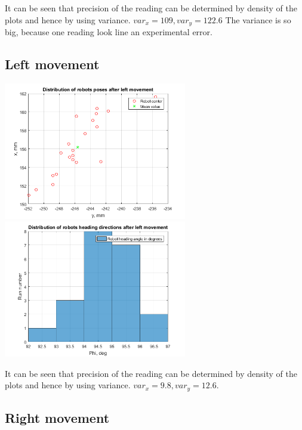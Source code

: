 \documentclass[a4paper, 12pt]{article}
\begin{document}
It can be seen that precision of the reading can be determined by density of the plots and hence by using variance. $var_x = 109,var_y = 122.6$ The variance is so big, because one reading look line an experimental error.



\newpage

\subsection{Left movement}


\begin{center}
  \includegraphics[width=0.6\textwidth]{LL}
  \includegraphics[width=0.6\textwidth]{LLphi}
\end{center}

It can be seen that precision of the reading can be determined by density of the plots and hence by using variance. $var_x = 9.8,var_y = 12.6$.
\newpage
\subsection{Right movement}
\end{document}
